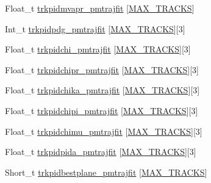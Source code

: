 \begin{DoxyCompactItemize}
\item 
Float\-\_\-t \hyperlink{classanatree_a2a02ebfb204d49befb28b466a2720f9e}{trkpidmvapr\-\_\-pmtrajfit} \mbox{[}\hyperlink{anatree__core__v09410002__orig_8h_a327fd4e796e4a0d78947524c96e4362e}{M\-A\-X\-\_\-\-T\-R\-A\-C\-K\-S}\mbox{]}
\item 
Int\-\_\-t \hyperlink{classanatree_a6b025f1c33d29e35c07d799a350af0b0}{trkpidpdg\-\_\-pmtrajfit} \mbox{[}\hyperlink{anatree__core__v09410002__orig_8h_a327fd4e796e4a0d78947524c96e4362e}{M\-A\-X\-\_\-\-T\-R\-A\-C\-K\-S}\mbox{]}\mbox{[}3\mbox{]}
\item 
Float\-\_\-t \hyperlink{classanatree_a998285285751cf5584e4831fd07fe150}{trkpidchi\-\_\-pmtrajfit} \mbox{[}\hyperlink{anatree__core__v09410002__orig_8h_a327fd4e796e4a0d78947524c96e4362e}{M\-A\-X\-\_\-\-T\-R\-A\-C\-K\-S}\mbox{]}\mbox{[}3\mbox{]}
\item 
Float\-\_\-t \hyperlink{classanatree_a7bbaa141c9a2a46a901631a1bcc877b8}{trkpidchipr\-\_\-pmtrajfit} \mbox{[}\hyperlink{anatree__core__v09410002__orig_8h_a327fd4e796e4a0d78947524c96e4362e}{M\-A\-X\-\_\-\-T\-R\-A\-C\-K\-S}\mbox{]}\mbox{[}3\mbox{]}
\item 
Float\-\_\-t \hyperlink{classanatree_a6a05fa8f75ccecb35ac811b5348bf5ee}{trkpidchika\-\_\-pmtrajfit} \mbox{[}\hyperlink{anatree__core__v09410002__orig_8h_a327fd4e796e4a0d78947524c96e4362e}{M\-A\-X\-\_\-\-T\-R\-A\-C\-K\-S}\mbox{]}\mbox{[}3\mbox{]}
\item 
Float\-\_\-t \hyperlink{classanatree_a2487641b188b3ff39acbd6165a77b4f1}{trkpidchipi\-\_\-pmtrajfit} \mbox{[}\hyperlink{anatree__core__v09410002__orig_8h_a327fd4e796e4a0d78947524c96e4362e}{M\-A\-X\-\_\-\-T\-R\-A\-C\-K\-S}\mbox{]}\mbox{[}3\mbox{]}
\item 
Float\-\_\-t \hyperlink{classanatree_ad41d442e1477f440a9f3fcb58ecf75f0}{trkpidchimu\-\_\-pmtrajfit} \mbox{[}\hyperlink{anatree__core__v09410002__orig_8h_a327fd4e796e4a0d78947524c96e4362e}{M\-A\-X\-\_\-\-T\-R\-A\-C\-K\-S}\mbox{]}\mbox{[}3\mbox{]}
\item 
Float\-\_\-t \hyperlink{classanatree_a08f534ef3bcf5ffe47fe7382a521b5bb}{trkpidpida\-\_\-pmtrajfit} \mbox{[}\hyperlink{anatree__core__v09410002__orig_8h_a327fd4e796e4a0d78947524c96e4362e}{M\-A\-X\-\_\-\-T\-R\-A\-C\-K\-S}\mbox{]}\mbox{[}3\mbox{]}
\item 
Short\-\_\-t \hyperlink{classanatree_ae7cc9eb4cbf68978ab8bbf7da5ff916a}{trkpidbestplane\-\_\-pmtrajfit} \mbox{[}\hyperlink{anatree__core__v09410002__orig_8h_a327fd4e796e4a0d78947524c96e4362e}{M\-A\-X\-\_\-\-T\-R\-A\-C\-K\-S}\mbox{]}

\end{DoxyCompactItemize}
